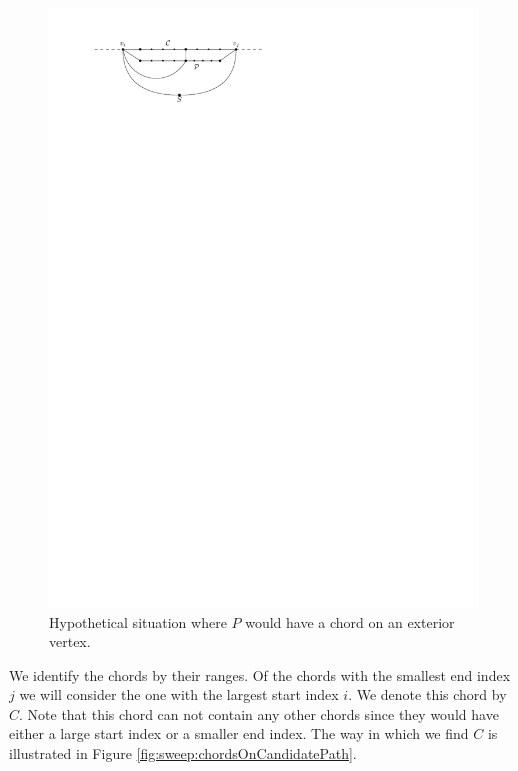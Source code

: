     \begin{figure}[h]
      \centering
      \includegraphics[scale=1]{unifiedAlgo/img/sweep/noChordOnExtriorVertex.pdf}
      \caption{Hypothetical situation where $P$ would have a chord on an exterior vertex.}
      \label{fig:sweep:noChordOnExteriorVertex}
    \end{figure}

    We identify the chords by their ranges. Of the chords with the smallest end index $j$ we will consider the one with the largest start index $i$. We denote this chord by $C$. Note that this chord can not contain any other chords since they would have either a large start index or a smaller end index.
    The way in which we find $C$ is illustrated in Figure \ref{fig:sweep:chordsOnCandidatePath}.

